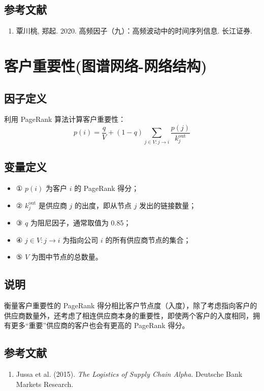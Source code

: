 \documentclass{article}
\begin{document}
\subsection{参考文献}
\begin{enumerate}
    \item 覃川桃, 郑起. 2020. 高频因子（九）：高频波动中的时间序列信息. 长江证券.
\end{enumerate}

\section{客户重要性(图谱网络-网络结构)}

\subsection{因子定义}
利用 PageRank 算法计算客户重要性：
\begin{equation}
    p(i) = \frac{q}{V} + (1 - q) \sum_{j \in V: j \to i} \frac{p(j)}{k_j^{\mathrm{out}}}
\end{equation}

\subsection{变量定义}
\begin{itemize}
    \item ① \( p(i) \) 为客户 \( i \) 的 PageRank 得分；
    \item ② \( k_j^{\mathrm{out}} \) 是供应商 \( j \) 的出度，即从节点 \( j \) 发出的链接数量；
    \item ③ \( q \) 为阻尼因子，通常取值为 0.85；
    \item ④ \( j \in V: j \to i \) 为指向公司 \( i \) 的所有供应商节点的集合；
    \item ⑤ \( V \) 为图中节点的总数量。
\end{itemize}

\subsection{说明}
衡量客户重要性的 PageRank 得分相比客户节点度（入度），除了考虑指向客户的供应商数量外，还考虑了相连供应商本身的重要性，即使两个客户的入度相同，拥有更多“重要”供应商的客户也会有更高的 PageRank 得分。

\subsection{参考文献}
\begin{enumerate}
    \item Jussa et al. (2015). \textit{The Logistics of Supply Chain Alpha}. Deutsche Bank Markets Research.
\end{enumerate}
\end{document}
